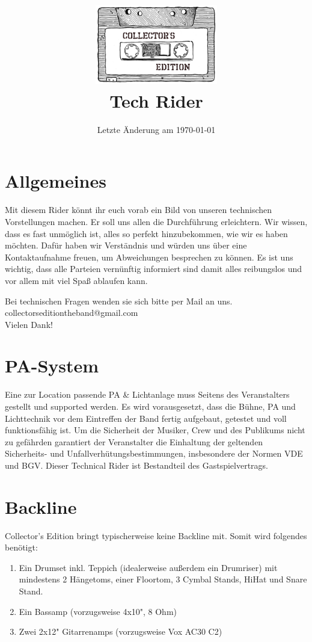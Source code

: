 \documentclass{article}
\title{\includegraphics[width=0.4\textwidth]{figures/BandLogo} \\Tech Rider}
\date{Letzte Änderung am \today}
\begin{document}
  \maketitle
  \thispagestyle{empty}

  \section*{Allgemeines}
  Mit diesem Rider könnt ihr euch vorab ein Bild von unseren technischen Vorstellungen machen.
   Er soll uns allen die Durchführung erleichtern. Wir wissen, dass es fast unmöglich ist, alles so
   perfekt hinzubekommen, wie wir es haben möchten. Dafür haben wir Verständnis und würden uns über eine
   Kontaktaufnahme freuen, um Abweichungen besprechen zu können. Es ist uns wichtig, dass alle Parteien
   vernünftig informiert sind damit alles reibungslos und vor allem mit viel Spaß ablaufen kann.

   Bei technischen Fragen wenden sie sich bitte per Mail an uns.\\
   collectorseditiontheband@gmail.com\\
   Vielen Dank!

  \section*{PA-System}

  Eine zur Location passende PA \& Lichtanlage muss Seitens des Veranstalters gestellt und supported
  werden. Es wird vorausgesetzt, dass die Bühne, PA und Lichttechnik vor dem Eintreffen der Band fertig
  aufgebaut, getestet und voll funktionsfähig ist. Um die Sicherheit der Musiker, Crew und des Publikums
  nicht zu gefährden garantiert der Veranstalter die Einhaltung der geltenden Sicherheits- und
  Unfallverhütungsbestimmungen, insbesondere der Normen VDE und BGV. Dieser Technical Rider ist
  Bestandteil des Gastspielvertrags.

  \section*{Backline}

  Collector's Edition bringt typischerweise keine Backline mit. Somit wird folgendes
  benötigt:

  \begin{enumerate}
  \item Ein Drumset inkl. Teppich (idealerweise außerdem ein Drumriser) mit
  mindestens 2 Hängetoms, einer Floortom, 3 Cymbal Stands, HiHat und Snare Stand.
  \item Ein Bassamp (vorzugsweise 4x10", 8 Ohm)
  \item Zwei 2x12" Gitarrenamps (vorzugsweise Vox AC30 C2)
  \end{enumerate}
\end{document}
